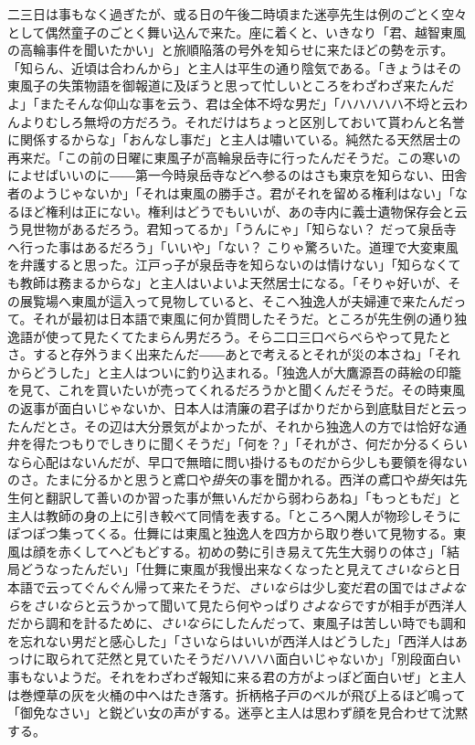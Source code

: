 \documentclass[12pt, openright]{book}
\begin{document}
二三日は事もなく過ぎたが、或る日の午後二時頃また迷亭先生は例のごとく空々として偶然童子のごとく舞い込んで来た。座に着くと、いきなり「君、越智東風の高輪事件を聞いたかい」と旅順陥落の号外を知らせに来たほどの勢を示す。「知らん、近頃は合わんから」と主人は平生の通り陰気である。「きょうはその東風子の失策物語を御報道に及ぼうと思って忙しいところをわざわざ来たんだよ」「またそんな仰山な事を云う、君は全体不埒な男だ」「ハハハハハ不埒と云わんよりむしろ無埒の方だろう。それだけはちょっと区別しておいて貰わんと名誉に関係するからな」「おんなし事だ」と主人は嘯いている。純然たる天然居士の再来だ。「この前の日曜に東風子が高輪泉岳寺に行ったんだそうだ。この寒いのによせばいいのに――第一今時泉岳寺などへ参るのはさも東京を知らない、田舎者のようじゃないか」「それは東風の勝手さ。君がそれを留める権利はない」「なるほど権利は正にない。権利はどうでもいいが、あの寺内に義士遺物保存会と云う見世物があるだろう。君知ってるか」「うんにゃ」「知らない？ だって泉岳寺へ行った事はあるだろう」「いいや」「ない？ こりゃ驚ろいた。道理で大変東風を弁護すると思った。江戸っ子が泉岳寺を知らないのは情けない」「知らなくても教師は務まるからな」と主人はいよいよ天然居士になる。「そりゃ好いが、その展覧場へ東風が這入って見物していると、そこへ独逸人が夫婦連で来たんだって。それが最初は日本語で東風に何か質問したそうだ。ところが先生例の通り独逸語が使って見たくてたまらん男だろう。そら二口三口べらべらやって見たとさ。すると存外うまく出来たんだ――あとで考えるとそれが災の本さね」「それからどうした」と主人はついに釣り込まれる。「独逸人が大鷹源吾の蒔絵の印籠を見て、これを買いたいが売ってくれるだろうかと聞くんだそうだ。その時東風の返事が面白いじゃないか、日本人は清廉の君子ばかりだから到底駄目だと云ったんだとさ。その辺は大分景気がよかったが、それから独逸人の方では恰好な通弁を得たつもりでしきりに聞くそうだ」「何を？」「それがさ、何だか分るくらいなら心配はないんだが、早口で無暗に問い掛けるものだから少しも要領を得ないのさ。たまに分るかと思うと鳶口や\emph{掛矢}の事を聞かれる。西洋の鳶口や\emph{掛矢}は先生何と翻訳して善いのか習った事が無いんだから弱わらあね」「もっともだ」と主人は教師の身の上に引き較べて同情を表する。「ところへ閑人が物珍しそうにぽつぽつ集ってくる。仕舞には東風と独逸人を四方から取り巻いて見物する。東風は顔を赤くしてへどもどする。初めの勢に引き易えて先生大弱りの体さ」「結局どうなったんだい」「仕舞に東風が我慢出来なくなったと見えて\emph{さいなら}と日本語で云ってぐんぐん帰って来たそうだ、\emph{さいなら}は少し変だ君の国では\emph{さよなら}を\emph{さいなら}と云うかって聞いて見たら何やっぱり\emph{さよなら}ですが相手が西洋人だから調和を計るために、\emph{さいなら}にしたんだって、東風子は苦しい時でも調和を忘れない男だと感心した」「さいならはいいが西洋人はどうした」「西洋人はあっけに取られて茫然と見ていたそうだハハハハ面白いじゃないか」「別段面白い事もないようだ。それをわざわざ報知に来る君の方がよっぽど面白いぜ」と主人は巻煙草の灰を火桶の中へはたき落す。折柄格子戸のベルが飛び上るほど鳴って「御免なさい」と鋭どい女の声がする。迷亭と主人は思わず顔を見合わせて沈黙する。
\end{document}
